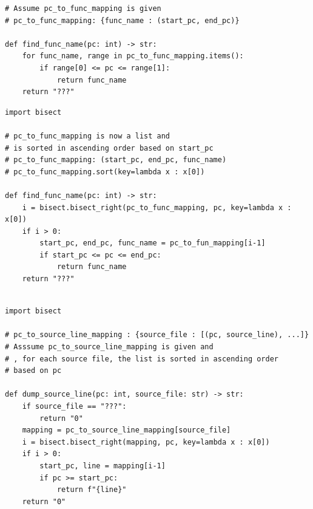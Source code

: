 \medskip
\begin{center}
\begin{minipage}{\textwidth}
\begin{lstlisting}
# Assume pc_to_func_mapping is given
# pc_to_func_mapping: {func_name : (start_pc, end_pc)}

def find_func_name(pc: int) -> str:
    for func_name, range in pc_to_func_mapping.items():
        if range[0] <= pc <= range[1]:
            return func_name
    return "???"

\end{lstlisting}
\end{minipage}
\end{center}

\begin{center}
\begin{minipage}{\textwidth}
\begin{lstlisting}
import bisect

# pc_to_func_mapping is now a list and
# is sorted in ascending order based on start_pc
# pc_to_func_mapping: (start_pc, end_pc, func_name) 
# pc_to_func_mapping.sort(key=lambda x : x[0])

def find_func_name(pc: int) -> str:
    i = bisect.bisect_right(pc_to_func_mapping, pc, key=lambda x : x[0])
    if i > 0:
        start_pc, end_pc, func_name = pc_to_fun_mapping[i-1]
        if start_pc <= pc <= end_pc:
            return func_name
    return "???"
    
\end{lstlisting}
\end{minipage}
\end{center} 

\begin{center}
\begin{minipage}{\textwidth}
\begin{lstlisting}
import bisect

# pc_to_source_line_mapping : {source_file : [(pc, source_line), ...]}
# Asssume pc_to_source_line_mapping is given and
# , for each source file, the list is sorted in ascending order
# based on pc

def dump_source_line(pc: int, source_file: str) -> str:
    if source_file == "???":
        return "0"
    mapping = pc_to_source_line_mapping[source_file]
    i = bisect.bisect_right(mapping, pc, key=lambda x : x[0])
    if i > 0:
        start_pc, line = mapping[i-1]
        if pc >= start_pc:
            return f"{line}"
    return "0"

\end{lstlisting}
\end{minipage}
\end{center}

